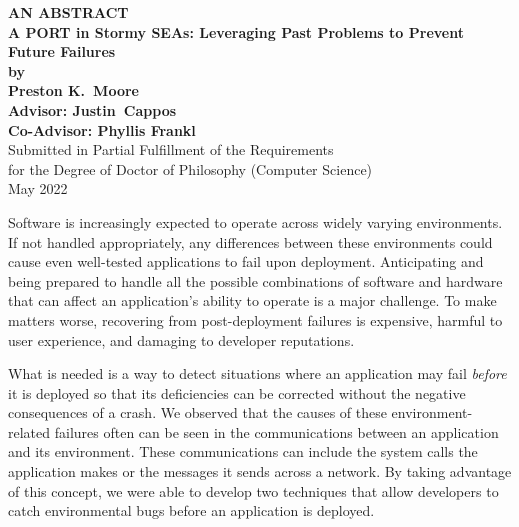 \begin{center}

{\large\bf
   AN ABSTRACT\\[3ex]
   A PORT in Stormy SEAs: Leveraging Past Problems to Prevent Future Failures\\[2ex]
   by\\[3ex]
   Preston K.\ Moore\\[3ex]
   Advisor: Justin\ Cappos\\[2ex]
   Co-Advisor: Phyllis Frankl
}\\[3ex]
Submitted in Partial Fulfillment of the Requirements\\[2ex]
for the Degree of Doctor of Philosophy (Computer Science)\\[3ex]
May 2022
\end{center}

\vspace*{2.5ex}


Software is increasingly expected to operate across widely varying environments.
If not handled appropriately, any
differences between these environments
could cause even well-tested applications to fail upon deployment.
Anticipating and being prepared to handle all the possible combinations of
software and hardware that can affect an application’s ability to operate
is a major challenge.
To make matters worse,
recovering from post-deployment failures is expensive,
harmful to user experience,
and damaging to developer reputations.

What is needed is a way to detect situations where an application may fail
\textit{before} it is deployed so that its deficiencies can be corrected without the negative consequences of a crash.
We observed that
the causes of these environment-related failures
often can be seen in the
communications between an application and its environment.
These communications can include the
system calls the application makes or the messages it sends across a network.
By taking advantage of this concept,
we were able to develop two techniques that allow developers to catch environmental bugs
before an application is deployed. 

